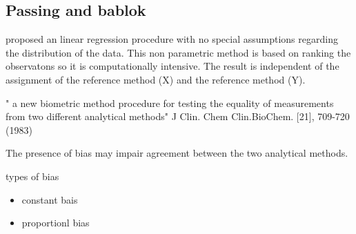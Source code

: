 \documentclass[MAIN.tex]{subfiles}
\begin{document}


\subsection{Passing and bablok}
proposed an linear regression procedure with no special assumptions regarding the distribution of the data.
This non parametric method is based on ranking the observatons so it is computationally intensive.
The result is independent of the assignment of the reference method (X) and the reference method (Y).

" a new biometric method procedure for testing the equality of measurements from two different analytical methods"
J Clin. Chem Clin.BioChem. [21], 709-720 (1983)

The presence of bias may impair agreement between the two analytical methods.

types of bias

\begin{itemize}
	\item constant bais
	\item proportionl bias
\end{itemize}










\end{document}

